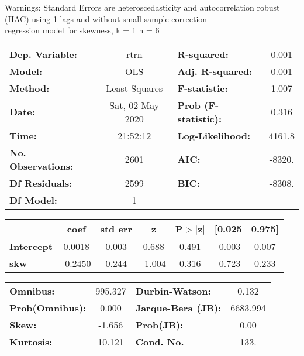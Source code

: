 Warnings: \newline
 [1] Standard Errors are heteroscedasticity and autocorrelation robust (HAC) using 1 lags and without small sample correction\\ 

regression model for skewness, k = 1 h = 6\begin{center}
\begin{tabular}{lclc}
\toprule
\textbf{Dep. Variable:}    &       rtrn       & \textbf{  R-squared:         } &     0.001   \\
\textbf{Model:}            &       OLS        & \textbf{  Adj. R-squared:    } &     0.001   \\
\textbf{Method:}           &  Least Squares   & \textbf{  F-statistic:       } &     1.007   \\
\textbf{Date:}             & Sat, 02 May 2020 & \textbf{  Prob (F-statistic):} &    0.316    \\
\textbf{Time:}             &     21:52:12     & \textbf{  Log-Likelihood:    } &    4161.8   \\
\textbf{No. Observations:} &        2601      & \textbf{  AIC:               } &    -8320.   \\
\textbf{Df Residuals:}     &        2599      & \textbf{  BIC:               } &    -8308.   \\
\textbf{Df Model:}         &           1      & \textbf{                     } &             \\
\bottomrule
\end{tabular}
\begin{tabular}{lcccccc}
                   & \textbf{coef} & \textbf{std err} & \textbf{z} & \textbf{P$> |$z$|$} & \textbf{[0.025} & \textbf{0.975]}  \\
\midrule
\textbf{Intercept} &       0.0018  &        0.003     &     0.688  &         0.491        &       -0.003    &        0.007     \\
\textbf{skw}       &      -0.2450  &        0.244     &    -1.004  &         0.316        &       -0.723    &        0.233     \\
\bottomrule
\end{tabular}
\begin{tabular}{lclc}
\textbf{Omnibus:}       & 995.327 & \textbf{  Durbin-Watson:     } &    0.132  \\
\textbf{Prob(Omnibus):} &   0.000 & \textbf{  Jarque-Bera (JB):  } & 6683.994  \\
\textbf{Skew:}          &  -1.656 & \textbf{  Prob(JB):          } &     0.00  \\
\textbf{Kurtosis:}      &  10.121 & \textbf{  Cond. No.          } &     133.  \\
\bottomrule
\end{tabular}
\end{center}

